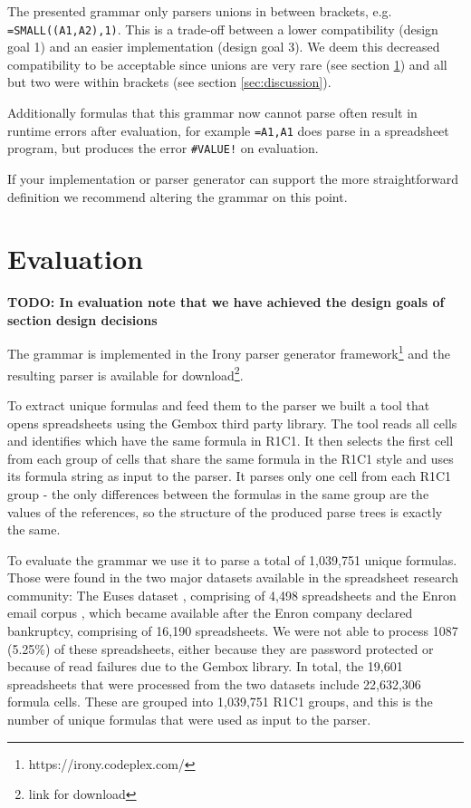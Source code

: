 \documentclass[conference]{IEEEtran}
\newcommand{\todo}[1]{\textbf{TODO: #1}}
\begin{document}
The presented grammar only parsers unions in between brackets, e.g. \texttt{=SMALL((A1,A2),1)}.
This is a trade-off between a lower compatibility (design goal 1) and an easier implementation (design goal 3).
We deem this decreased compatibility to be acceptable since unions are very rare (see section \ref{sec:evaluation}) and all but two were within brackets (see section \ref{sec:discussion}).

Additionally formulas that this grammar now cannot parse often result in runtime errors after evaluation, for example \texttt{=A1,A1} does parse in a spreadsheet program, but produces the error \texttt{\#VALUE!} on evaluation.

If your implementation or parser generator can support the more straightforward definition we recommend altering the grammar on this point.


\section{Evaluation}
\label{sec:evaluation}

\todo{In evaluation note that we have achieved the design goals of section design decisions}

The grammar is implemented in the Irony parser generator framework\footnote{https://irony.codeplex.com/} and the resulting parser is available for download\footnote{link for download}.

To extract unique formulas and feed them to the parser we built a tool that opens spreadsheets using the Gembox third party library. The tool reads all cells and identifies which have the same formula in R1C1. It then selects the first cell from each group of cells that share the same formula in the R1C1 style and uses its formula string as input to the parser. It parses only one cell from each R1C1 group - the only differences between the formulas in the same group are the values of the references, so the structure of the produced parse trees is exactly the same.

To evaluate the grammar we use it to parse a total of 1,039,751 unique formulas. Those were found in the two major datasets available in the spreadsheet research community: The Euses dataset \cite{euses}, comprising of 4,498 spreadsheets and the Enron email corpus \cite{enron}, which became available after the Enron company declared bankruptcy, comprising of 16,190 spreadsheets. We were not able to process 1087 (5.25\%) of these spreadsheets, either because they are password protected or because of read failures due to the Gembox library. In total, the 19,601 spreadsheets that were processed from the two datasets include 22,632,306 formula cells. These are grouped into 1,039,751 R1C1 groups, and this is the number of unique formulas that were used as input to the parser.
\end{document}
